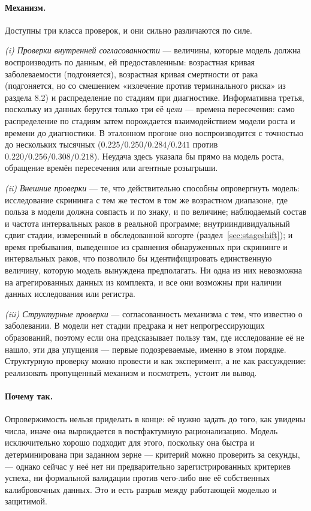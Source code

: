 \documentclass[12pt,a4paper]{article}
\newcommand{\mech}[1]{\paragraph{Механизм.} #1}
\newcommand{\why}[1]{\paragraph{Почему так.} #1}
\begin{document}
\mech{Доступны три класса проверок, и они сильно различаются по силе.

\emph{(i) Проверки внутренней согласованности} --- величины, которые модель должна воспроизводить по
данным, ей предоставленным: возрастная кривая заболеваемости (подгоняется), возрастная кривая смертности от
рака (подгоняется, но со смешением «излечение против терминального риска» из раздела 8.2) и распределение по
стадиям при диагностике. Информативна третья, поскольку из данных берутся только три её \emph{цели} ---
времена пересечения: само распределение по стадиям затем порождается взаимодействием модели роста и времени
до диагностики. В эталонном прогоне оно воспроизводится с точностью до нескольких тысячных
($0.225/0.250/0.284/0.241$ против $0.220/0.256/0.308/0.218$). Неудача здесь указала бы прямо на модель
роста, обращение времён пересечения или агентные розыгрыши.

\emph{(ii) Внешние проверки} --- те, что действительно способны опровергнуть модель: исследование скрининга
с тем же тестом в том же возрастном диапазоне, где польза в модели должна совпасть и по знаку, и по
величине; наблюдаемый состав и частота интервальных раков в реальной программе; внутрииндивидуальный сдвиг
стадии, измеренный в обследованной когорте (раздел~\ref{sec:stageshift}); и время пребывания, выведенное из
сравнения обнаруженных при скрининге и интервальных раков, что позволило бы идентифицировать единственную
величину, которую модель вынуждена предполагать. Ни одна из них невозможна на агрегированных данных из
комплекта, и все они возможны при наличии данных исследования или регистра.

\emph{(iii) Структурные проверки} --- согласованность механизма с тем, что известно о заболевании. В модели
нет стадии предрака и нет непрогрессирующих образований, поэтому если она предсказывает пользу там, где
исследование её не нашло, эти два упущения --- первые подозреваемые, именно в этом порядке. Структурную
проверку можно провести и как эксперимент, а не как рассуждение: реализовать пропущенный механизм и
посмотреть, устоит ли вывод.}

\why{Опровержимость нельзя приделать в конце: её нужно задать до того, как увидены числа, иначе она
вырождается в постфактумную рационализацию. Модель исключительно хорошо подходит для этого, поскольку она
быстра и детерминирована при заданном зерне --- критерий можно проверить за секунды, --- однако сейчас у неё
нет ни предварительно зарегистрированных критериев успеха, ни формальной валидации против чего-либо вне её
собственных калибровочных данных. Это и есть разрыв между работающей моделью и защитимой.}
\end{document}
